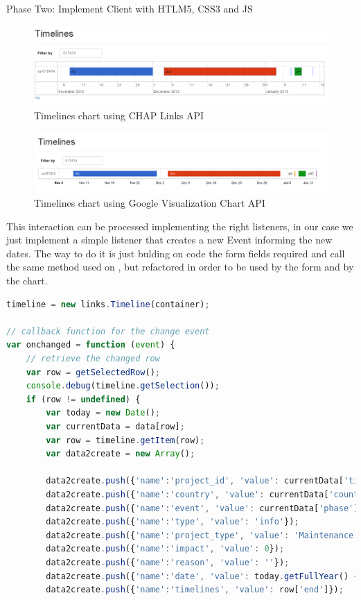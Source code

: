 \begin{part}{Phase Two: Implement Client with HTLM5, CSS3 and JS}
\begin{figure}[ht!]
	\centering
   	\includegraphics[width=1\textwidth]{./resources/timeline_chap.png}
   	\caption{Timelines chart using CHAP Links API}
   	\label{f_timeline_chap}
\end{figure}

\begin{figure}[ht!]
	\centering
   	\includegraphics[width=1\textwidth]{./resources/timeline_google.png}
   	\caption{Timelines chart using Google Visualization Chart API}
   	\label{f_timeline_google}
\end{figure} 

This interaction can be processed implementing the right listeners, in our case
we just implement a simple listener that creates a new Event informing the new
dates. The way to do it is just bulding on code the form fields required and
call the same method used on , but
refactored in order to be used by the form and by the chart.
\newpage
\begin{lstlisting}[language=Javascript,breaklines=true,caption=CHAP On\
change\ event,label=f_interactivetimelines_onchange_code] 
timeline = new links.Timeline(container);
	
// callback function for the change event
var onchanged = function (event) {
    // retrieve the changed row
    var row = getSelectedRow();
    console.debug(timeline.getSelection());
    if (row != undefined) {
        var today = new Date();
        var currentData = data[row];
        var row = timeline.getItem(row);
        var data2create = new Array();
        
        data2create.push({'name':'project_id', 'value': currentData['ticket']});
        data2create.push({'name':'country', 'value': currentData['country']});
        data2create.push({'name':'event', 'value': currentData['phase']});
        data2create.push({'name':'type', 'value': 'info'});
        data2create.push({'name':'project_type', 'value': 'Maintenance'});
        data2create.push({'name':'impact', 'value': 0});
        data2create.push({'name':'reason', 'value': ''});
        data2create.push({'name':'date', 'value': today.getFullYear() +"-"+ today.getMonth()+1 +"-"+ today.getDate()});
        data2create.push({'name':'timelines', 'value': row['end']});
        

\end{lstlisting}
\end{part}
